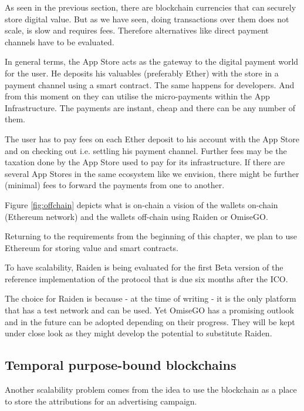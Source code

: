 As seen in the previous section, there are blockchain currencies that can securely store digital value. But as we have seen, doing transactions over them does not scale, is slow and requires fees. Therefore alternatives like direct payment channels have to be evaluated.

In general terms, the App Store acts as the gateway to the digital payment world for the user. He deposits his valuables (preferably Ether) with the store in a payment channel using a smart contract. The same happens for developers. And from this moment on they can utilise the micro-payments within the App Infrastructure. The payments are instant, cheap and there can be any number of them.

The user has to pay fees on each Ether deposit to his account with the App Store and on checking out i.e. settling his payment channel. Further fees may be the taxation done by the App Store used to pay for its infrastructure.  If there are several App Stores in the same ecosystem like we envision, there might be further (minimal) fees to forward the payments from one to another.

Figure \ref{fig:offchain} depicts what is on-chain a vision of the wallets on-chain (Ethereum network) and the wallets off-chain using Raiden or OmiseGO.


Returning to the requirements from the beginning of this chapter, we plan to use Ethereum for storing value and smart contracts. 

To have scalability, Raiden is being evaluated for the first Beta version of the reference implementation of the protocol that is due six months after the ICO. %

The choice for Raiden is because - at the time of writing - it is the only platform that has a test network and can be used. Yet OmiseGO has a promising outlook and in the future can be adopted depending on their progress. They will be kept under close look as they might develop the potential to substitute Raiden.

\subsection{Temporal purpose-bound blockchains}

Another scalability problem comes from the idea to use the blockchain as a place to store the attributions for an advertising campaign. 

